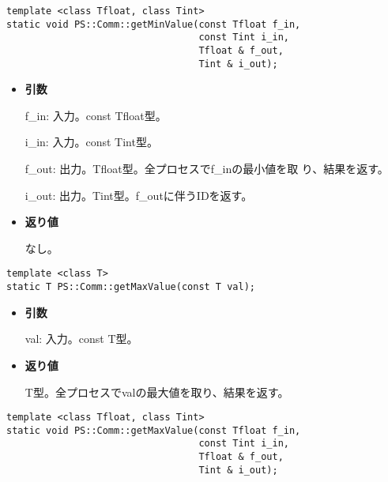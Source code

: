 \begin{screen}
\begin{verbatim}
template <class Tfloat, class Tint>
static void PS::Comm::getMinValue(const Tfloat f_in,
                                  const Tint i_in,
                                  Tfloat & f_out,
                                  Tint & i_out);
\end{verbatim}
\end{screen}

\begin{itemize}

\item{{\bf 引数}}

f\_in: 入力。const Tfloat型。

i\_in: 入力。const Tint型。

f\_out: 出力。Tfloat型。全プロセスでf\_inの最小値を取
り、結果を返す。

i\_out: 出力。Tint型。f\_outに伴うIDを返す。

\item{{\bf 返り値}}

なし。

\end{itemize}


\begin{screen}
\begin{verbatim}
template <class T>
static T PS::Comm::getMaxValue(const T val);
\end{verbatim}
\end{screen}

\begin{itemize}

\item{{\bf 引数}}

val: 入力。const T型。

\item{{\bf 返り値}}

T型。全プロセスでvalの最大値を取り、結果を返す。

\end{itemize}

\begin{screen}
\begin{verbatim}
template <class Tfloat, class Tint>
static void PS::Comm::getMaxValue(const Tfloat f_in,
                                  const Tint i_in,
                                  Tfloat & f_out,
                                  Tint & i_out);
\end{verbatim}
\end{screen}

